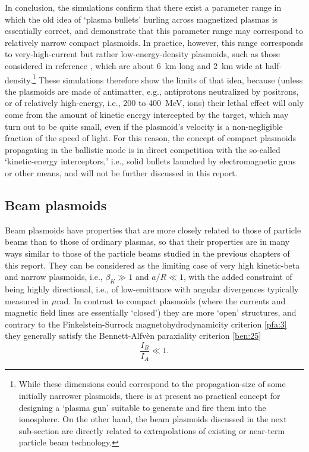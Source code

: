 \documentclass [12pt,a4paper,     ]{report} %
\begin{document}
   In conclusion, the simulations \cite{PAPAD1988-,PAPAD1991-} confirm that there exist a parameter range in which the old idea of `plasma bullets' hurling across magnetized plasmas \cite{TUCK-1959-} is essentially correct, and demonstrate that this parameter range may correspond to relatively narrow compact plasmoids.  In practice, however, this range corresponds to very-high-current but rather low-energy-density plasmoids, such as those considered in reference \cite{PAPAD1991-}, which are about 6~km long and 2~km wide at half-density.\footnote{While these dimensions could correspond to the propagation-size of some initially narrower plasmoids, there is at present no practical concept for designing a `plasma gun' suitable to generate and fire them into the ionosphere.  On the other hand, the beam plasmoids discussed in the next sub-section are directly related to extrapolations of existing or near-term particle beam technology.}   These simulations therefore show the limits of that idea, because (unless the plasmoids are made of antimatter, e.g., antiprotons neutralized by positrons, or of relatively high-energy, i.e., 200 to 400~MeV, ions) their lethal effect will only come from the amount of kinetic energy intercepted by the target, which may turn out to be quite small, even if the plasmoid's velocity is a non-negligible fraction of the speed of light.  For this reason, the concept of compact plasmoids propagating in the ballistic mode is in direct competition with the so-called `kinetic-energy interceptors,' i.e., solid bullets launched by electromagnetic guns or other means, and will not be further discussed in this report.



\subsection{Beam plasmoids}


   Beam  plasmoids have properties that are more closely related to those of particle beams than to those of ordinary plasmas, so that their properties are in many ways similar to those of the particle beams studied in the previous chapters of this report.  They can be considered as the limiting case of very high kinetic-beta and narrow plasmoids, i.e.,  $\beta_K \gg 1$ and  $a/R \ll 1$, with the added constraint of being highly directional, i.e., of low-emittance with angular divergences typically measured in $\mu$rad.  In contrast to compact plasmoids (where the currents and magnetic field lines are essentially `closed') they are more `open' structures, and contrary to the Finkelstein-Surrock magnetohydrodynamicity criterion \eqref{pfa:3} they generally satisfy the Bennett-Alfv\`en paraxiality criterion \eqref{ben:25}
%
\begin{equation}\label{pfa:4} 
        \frac{I_B}{I_A} \ll 1.
\end{equation}
%
\end{document}
